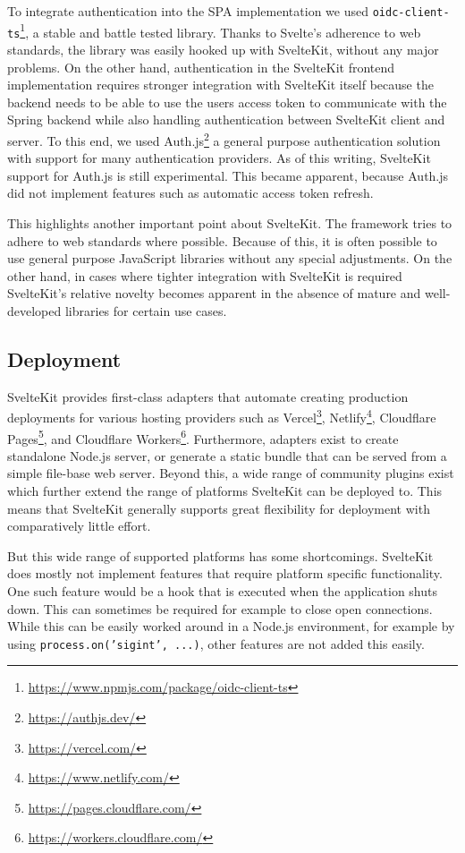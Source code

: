 To integrate authentication into the SPA implementation we used \texttt{oidc-client-ts}\footnote{\url{https://www.npmjs.com/package/oidc-client-ts}}, a stable and battle tested library. Thanks to Svelte's adherence to web standards, the library was easily hooked up with SvelteKit, without any major problems. On the other hand, authentication in the SvelteKit frontend implementation requires stronger integration with SvelteKit itself because the backend needs to be able to use the users access token to communicate with the Spring backend while also handling authentication between SvelteKit client and server. To this end, we used Auth.js\footnote{\url{https://authjs.dev/}} a general purpose authentication solution with support for many authentication providers. As of this writing, SvelteKit support for Auth.js is still experimental. This became apparent, because Auth.js did not implement features such as automatic access token refresh.

This highlights another important point about SvelteKit. The framework tries to adhere to web standards where possible. Because of this, it is often possible to use general purpose JavaScript libraries without any special adjustments. On the other hand, in cases where tighter integration with SvelteKit is required SvelteKit's relative novelty becomes apparent in the absence of mature and well-developed libraries for certain use cases.

\subsection{Deployment}
SvelteKit provides first-class adapters that automate creating production deployments for various hosting providers such as Vercel\footnote{\url{https://vercel.com/}}, Netlify\footnote{\url{https://www.netlify.com/}}, Cloudflare Pages\footnote{\url{https://pages.cloudflare.com/}}, and Cloudflare Workers\footnote{\url{https://workers.cloudflare.com/}}. Furthermore, adapters exist to create standalone Node.js server, or generate a static bundle that can be served from a simple file-base web server. Beyond this, a wide range of community plugins exist which further extend the range of platforms SvelteKit can be deployed to. This means that SvelteKit generally supports great flexibility for deployment with comparatively little effort.  

But this wide range of supported platforms has some shortcomings. SvelteKit does mostly not implement features that require platform specific functionality. One such feature would be a hook that is executed when the application shuts down. This can sometimes be required for example to close open connections. While this can be easily worked around in a Node.js environment, for example by using \texttt{process.on('sigint', ...)}, other features are not added this easily. 

